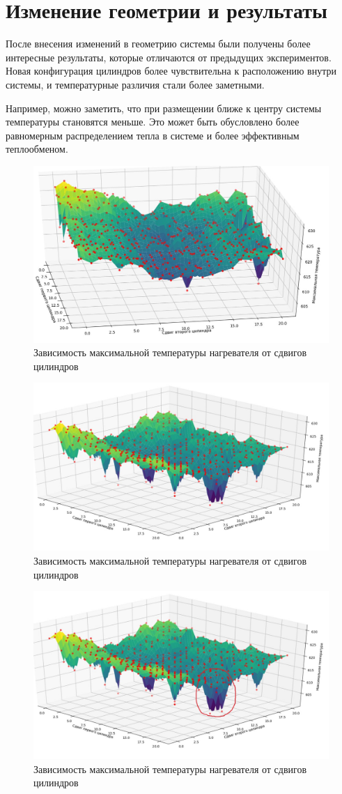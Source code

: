 \documentclass[a4paper,12pt]{article}
\theoremstyle{plain} %
\theoremstyle{definition} %
\theoremstyle{remark} %
\begin{document}
\section{Изменение геометрии и результаты}

После внесения изменений в геометрию системы были получены более интересные результаты, которые отличаются от предыдущих экспериментов. Новая конфигурация цилиндров более чувствительна к расположению внутри системы, и температурные различия стали более заметными.

Например, можно заметить, что при размещении ближе к центру системы температуры становятся меньше. Это может быть обусловлено более равномерным распределением тепла в системе и более эффективным теплообменом.

\begin{figure}[h]
	\begin{center}
		\includegraphics[width=0.4\linewidth]{21.1.jpg}
		\caption{Зависимость максимальной температуры нагревателя от сдвигов цилиндров} %
	\end{center}
\end{figure}
\begin{figure}[h]
	\begin{center}
		\includegraphics[width=0.4\linewidth]{21.2.jpg}
		\caption{Зависимость максимальной температуры нагревателя от сдвигов цилиндров} %
	\end{center}
\end{figure}
\begin{figure}[h]
	\begin{center}
		\includegraphics[width=0.4\linewidth]{21.3.jpg}
		\caption{Зависимость максимальной температуры нагревателя от сдвигов цилиндров} %
	\end{center}
\end{figure}
\end{document}
